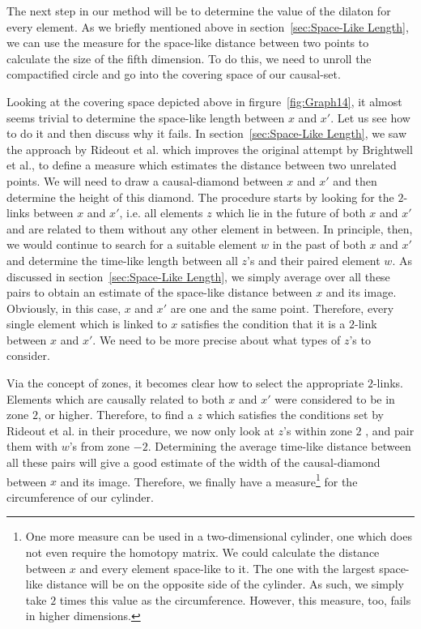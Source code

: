 \documentclass[a4paper,12pt]{article}
\numberwithin{equation}{section}
\begin{document}
The next step in our method will be to determine the value of the dilaton for every element. As we briefly mentioned above in section~\ref{sec:Space-Like Length}, we can use the measure for the space-like distance between two points to calculate the size of the fifth dimension. To do this, we need to unroll the compactified circle and go into the covering space of our causal-set.

Looking at the covering space depicted above in firgure~\ref{fig:Graph14}, it almost seems trivial to determine the space-like length between $x$ and $x'$. Let us see how to do it and then discuss why it fails. In section~\ref{sec:Space-Like Length}, we saw the approach by Rideout et al. which improves the original attempt by Brightwell et al., to define a measure which estimates the distance between two unrelated points. We will need to draw a causal-diamond between $x$ and $x'$ and then determine the height of this diamond. The procedure starts by looking for the $2$-links between $x$ and $x'$, i.e. all elements $z$ which lie in the future of both $x$ and $x'$ and are related to them without any other element in between. In principle, then, we would continue to search for a suitable element $w$ in the past of both $x$ and $x'$ and determine the time-like length between all $z$'s and their paired element $w$. As discussed in section~\ref{sec:Space-Like Length}, we simply average over all these pairs to obtain an estimate of the space-like distance between $x$ and its image. Obviously, in this case, $x$ and $x'$ are one and the same point. Therefore, every single element which is linked to $x$ satisfies the condition that it is a $2$-link between $x$ and $x'$. We need to be more precise about what types of $z$'s to consider.

Via the concept of zones, it becomes clear how to select the appropriate $2$-links. Elements which are causally related to both $x$ and $x'$ were considered to be in zone $2$, or higher. Therefore, to find a $z$ which satisfies the conditions set by Rideout et al. in their procedure, we now only look at $z$'s within zone $2$ , and pair them with $w$'s from zone $-2$. Determining the average time-like distance between all these pairs will give a good estimate of the width of the causal-diamond between $x$ and its image. Therefore, we finally have a measure\footnote{One more measure can be used in a two-dimensional cylinder, one which does not even require the homotopy matrix. We could calculate the distance between $x$ and every element space-like to it. The one with the largest space-like distance will be on the opposite side of the cylinder. As such, we simply take $2$ times this value as the circumference. However, this measure, too, fails in higher dimensions.} for the circumference of our cylinder.
\end{document}
